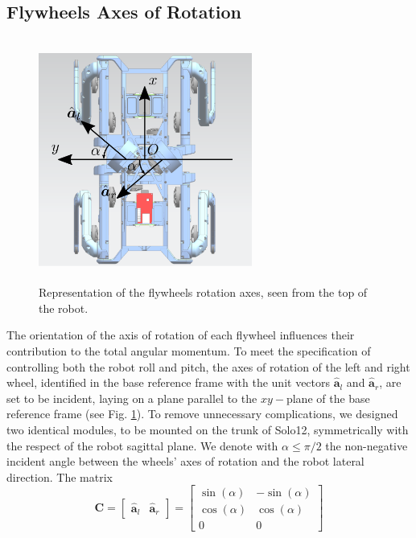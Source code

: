 \documentclass[sensors,article,submit,pdftex,moreauthors]{Definitions/mdpi}
\begin{document}
\subsection{Flywheels Axes of Rotation}
\begin{figure}[t]
	\centering
	\includegraphics[width=7cm,height=8cm,keepaspectratio]{figures/axes.eps}
	\caption{\small Representation of the flywheels rotation axes, seen from the top of the robot.}
	\label{fig:axes}
\end{figure}
The orientation of the axis of rotation of each flywheel influences their contribution to the total angular momentum. To meet the specification of controlling both the robot roll and pitch, the axes of rotation of the left and right wheel, identified in the base reference frame with the unit vectors $\hat{\bm{a}}_l$ and $\hat{\bm{a}}_r$, are set to be incident, laying on a plane parallel to the $xy-$plane of the base reference frame (see Fig. \ref{fig:axes}). 
To remove unnecessary complications, we designed two identical modules, to be mounted on the trunk of Solo12, symmetrically with the respect of the robot sagittal plane. We denote with $\alpha \leq \pi/2$ the non-negative incident angle between the wheels' axes of rotation and the robot lateral direction. The matrix 
\begin{equation}
\bm{C} = 
\left[ \begin{array}{cc}
\hat{\bm{a}}_l & \hat{\bm{a}}_r
\end{array} \right] = 
\left[ \begin{array}{cc}
\sin(\alpha) & -\sin(\alpha) \\
\cos(\alpha) & \cos(\alpha) \\
0 & 0
\end{array} \right]
\end{equation}
\end{document}
